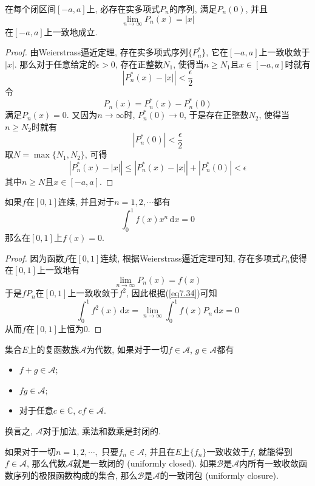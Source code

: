 \documentclass[cn,12pt,math=mtpro2,citestyle=gb7714-2015,bibstyle=gb7714-2015,twocol]{elegantbook}
\newcommand{\dx}{\,\text{d}x}
\newcommand{\limn}{\lim_{n\to\infty}}
\begin{document}
\begin{corollary}\label{cor:cor7.1}
在每个闭区间$[-a,a]$上, 必存在实多项式$P_n$的序列, 满足$P_n(0)$, 并且
$$\limn P_n(x)=|x|$$
在$[-a,a]$上一致地成立.
\end{corollary}
\begin{proof}
  由Weierstrass逼近定理, 存在实多项式序列$\{P_n^\ast\}$, 它在$[-a,a]$上一致收敛于$|x|$. 那么对于任意给定的$\epsilon>0$, 存在正整数$N_1$, 使得当$n\geq N_1$且$x\in[-a,a]$时就有
  $$\left|P_n^\ast(x)-|x|\right|<\frac{\epsilon}{2}$$
  令
  $$P_n(x)=P_n^\ast(x)-P_n^\ast(0)$$
  满足$P_n(x)=0$. 又因为$n\to\infty$时, $P_n^\ast(0)\to 0$, 于是存在正整数$N_2$, 使得当$n\geq N_2$时就有
  $$|P_n^\ast(0)|<\frac{\epsilon}{2}$$
  取$N=\max\{N_1,N_2\}$, 可得
  $$\left|P_n^\ast(x)-|x|\right|\leq\left|P_n^\ast(x)-|x|\right|+|P_n^\ast(0)|<\epsilon$$
  其中$n\geq N$且$x\in[-a,a]$.

\end{proof}
\begin{example}
如果$f$在$[0,1]$连续, 并且对于$n=1,2,\cdots$都有
\begin{equation}\label{eq7.34}
  \int_{0}^{1}f(x)x^n\dx=0
\end{equation}
那么在$[0,1]$上$f(x)=0$.
\end{example}
\begin{proof}
  因为函数$f$在$[0,1]$连续, 根据Weierstrass逼近定理可知, 存在多项式$P_n$使得在$[0,1]$上一致地有
  $$\lim_{n\to\infty}P_n(x)=f(x)$$
  于是$fP_n$在$[0,1]$上一致收敛于$f^2$, 因此根据(\ref{eq7.34})可知
  $$\int_{0}^{1}f^2(x)\dx=\limn \int_{0}^{1}f(x)P_n\dx=0$$
  从而$f$在$[0,1]$上恒为$0$.
\end{proof}
\begin{definition}
  集合$E$上的复函数族$\mathscr{A}$为代数, 如果对于一切$f\in\mathscr{A}$, $g\in\mathscr{A}$都有
  \begin{itemize}
   \item $f+g\in\mathscr{A}$;
   \item $fg\in\mathscr{A}$;
   \item 对于任意$c\in\mathbb{C}$, $cf\in\mathscr{A}$.
   \end{itemize}
   换言之, $\mathscr{A}$对于加法, 乘法和数乘是封闭的.
\end{definition}
\begin{definition}
如果对于一切$n=1,2,\cdots,$ 只要$f_n\in\mathscr{A}$, 并且在$E$上$\{f_n\}$一致收敛于$f$, 就能得到$f\in\mathscr{A}$, 那么代数$\mathscr{A}$就是一致闭的 (uniformly closed). 如果$\mathscr{B}$是$\mathscr{A}$内所有一致收敛函数序列的极限函数构成的集合, 那么$\mathscr{B}$是$\mathscr{A}$的一致闭包 (uniformly closure).
\end{definition}
\end{document}
